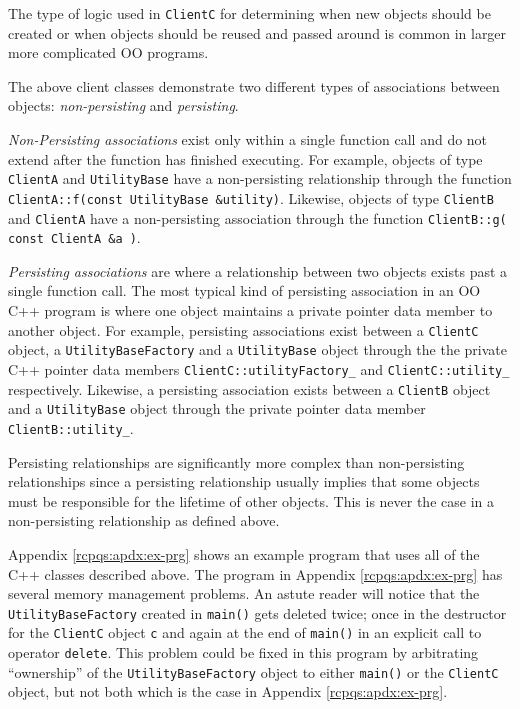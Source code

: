 \documentclass[pdf,ps2pdf,11pt]{SANDreport}
\begin{document}
The type of logic used in {}\texttt{ClientC} for determining when new
objects should be created or when objects should be reused and passed
around is common in larger more complicated OO programs.

The above client classes demonstrate two different types of
associations between objects: {}\textit{non-persisting} and
{}\textit{persisting}.

{}\textit{Non-Persisting
associations}\label{rcp:non-persisting-defined} exist only within a
single function call and do not extend after the function has finished
executing.  For example, objects of type {}\texttt{Client\-A} and
{}\texttt{Utility\-Base} have a non-persisting relationship through
the function {}\texttt{ClientA\-::f(const UtilityBase \&utility)}.
Likewise, objects of type {}\texttt{Client\-B} and
{}\texttt{Client\-A} have a non-persisting association through the
function {}\texttt{ClientB\-::g( const ClientA
\&a )}.

{}\textit{Persisting associations}\label{rcp:persisting-defined} are
where a relationship between two objects exists past a single function
call.  The most typical kind of persisting association in an OO C++
program is where one object maintains a private pointer data member to
another object.  For example, persisting associations exist between a
{}\texttt{ClientC} object, a {}\texttt{Utility\-Base\-Factory} and a
{}\texttt{Utility\-Base} object through the the private C++ pointer
data members {}\texttt{ClientC\-::utility\-Factory\_} and
{}\texttt{ClientC\-::utility\_} respectively.  Likewise, a persisting
association exists between a {}\texttt{ClientB} object and a
{}\texttt{Utility\-Base} object through the private pointer data
member {}\texttt{ClientB\-::utility\_}.

Persisting relationships are significantly more complex than
non-persisting relationships since a persisting relationship usually
implies that some objects must be responsible for the lifetime of
other objects.  This is never the case in a non-persisting relationship as
defined above.

Appendix {}\ref{rcpqs:apdx:ex-prg} shows an example program that uses
all of the C++ classes described above.  The program in Appendix
{}\ref{rcpqs:apdx:ex-prg} has several memory management problems. An
astute reader will notice that the {}\texttt{Utility\-Base\-Factory}
created in {}\texttt{main()} gets deleted twice; once in the
destructor for the {}\texttt{ClientC} object {}\texttt{c} and again at
the end of {}\texttt{main()} in an explicit call to operator
{}\texttt{delete}.  This problem could be fixed in this program by
arbitrating ``ownership'' of the {}\texttt{Utility\-Base\-Factory}
object to either {}\texttt{main()} or the {}\texttt{ClientC} object,
but not both which is the case in Appendix {}\ref{rcpqs:apdx:ex-prg}.
\end{document}
